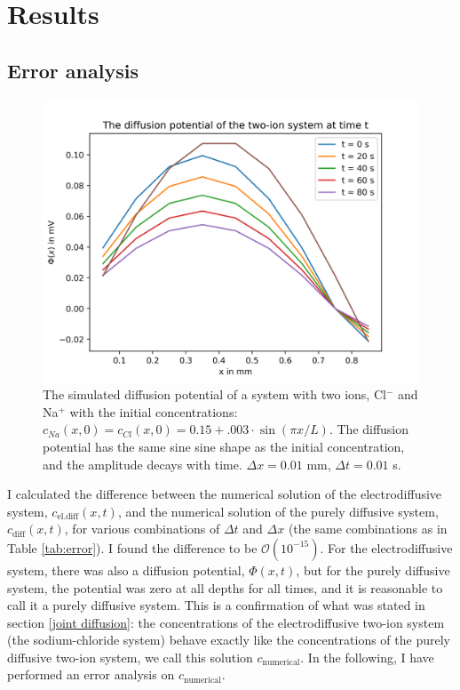 \documentclass{uiophd}
\begin{document}
\chapter{Results}
\section{Error analysis}\label{numerical vs analytical}

\begin{figure}
  \centering
  \includegraphics[width=\linewidth,height=0.6\textheight,keepaspectratio]{two_ions.png}
  \caption{The simulated diffusion potential of a system with two ions, Cl$^-$ and Na$^+$ with the initial concentrations: $c_{Na}(x,0)=c_{Cl}(x,0)=0.15 + .003\cdot \sin(\pi x/L)$. The diffusion potential has the same sine sine shape as the initial concentration, and the amplitude decays with time. $\Delta x = 0.01$ mm, $\Delta t = 0.01 $ s. }
  \label{fig:two_ions}
\end{figure}
I calculated the difference between the numerical solution of the electrodiffusive system, $c_{\text{el.diff}}(x,t)$, and the numerical solution of the purely diffusive system, $c_{\text{diff}}(x,t)$, for various combinations of $\Delta t$ and $\Delta x$ (the same combinations as in Table \ref{tab:error}). I found the difference to be $\mathcal{O}(10^{-15})$.  For the electrodiffusive system, there was also a diffusion potential, $\Phi(x,t)$, but for the purely diffusive system, the potential was zero at all depths for all times, and it is reasonable to call it a purely diffusive system. This is a confirmation of what was stated in section \ref{joint diffusion}: the concentrations of the electrodiffusive two-ion system (the sodium-chloride system) behave exactly like the concentrations of the purely diffusive two-ion system, we call this solution $c_{\text{numerical}}$. In the following, I have performed an error analysis on $c_{\text{numerical}}$.
\end{document}
